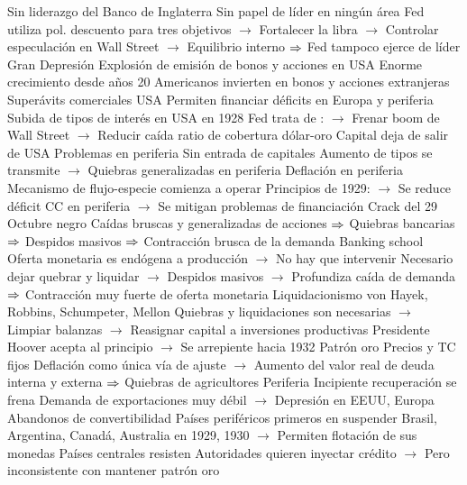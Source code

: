 \documentclass{nuevotema}
\begin{document}
\begin{esquemal}
				\4 Sin liderazgo del Banco de Inglaterra
				\4[] Sin papel de líder en ningún área
				\4[] Fed utiliza pol. descuento para tres objetivos
				\4[] $\to$ Fortalecer la libra
				\4[] $\to$ Controlar especulación en Wall Street
				\4[] $\to$ Equilibrio interno
				\4[] $\Rightarrow$ Fed tampoco ejerce de líder
			\3 Gran Depresión
				\4 Explosión de emisión de bonos y acciones en USA
				\4[] Enorme crecimiento desde años 20
				\4[] Americanos invierten en bonos y acciones extranjeras
				\4 Superávits comerciales USA
				\4[] Permiten financiar déficits en Europa y periferia
				\4 Subida de tipos de interés en USA en 1928
				\4[] Fed trata de :
				\4[] $\to$ Frenar boom de Wall Street
				\4[] $\to$ Reducir caída ratio de cobertura dólar-oro
				\4[] Capital deja de salir de USA
				\4 Problemas en periferia
				\4[] Sin entrada de capitales
				\4[] Aumento de tipos se transmite
				\4[] $\to$ Quiebras generalizadas en periferia
				\4 Deflación en periferia
				\4[] Mecanismo de flujo-especie comienza a operar
				\4[] Principios de 1929:
				\4[] $\to$ Se reduce déficit CC en periferia
				\4[] $\to$ Se mitigan problemas de financiación
				\4 Crack del 29
				\4[] Octubre negro
				\4[] Caídas bruscas y generalizadas de acciones
				\4[] $\Rightarrow$ Quiebras bancarias
				\4[] $\Rightarrow$ Despidos masivos
				\4[] $\Rightarrow$ Contracción brusca de la demanda
				\4 Banking school
				\4[] Oferta monetaria es endógena a producción
				\4[] $\to$ No hay que intervenir
				\4[] Necesario dejar quebrar y liquidar
				\4[] $\to$ Despidos masivos
				\4[] $\to$ Profundiza caída de demanda
				\4[] $\Rightarrow$ Contracción muy fuerte de oferta monetaria
				\4 Liquidacionismo
				\4[] von Hayek, Robbins, Schumpeter, Mellon
				\4[] Quiebras y liquidaciones son necesarias
				\4[] $\to$ Limpiar balanzas
				\4[] $\to$ Reasignar capital a inversiones productivas
				\4[] Presidente Hoover acepta al principio
				\4[] $\to$ Se arrepiente hacia 1932
				\4 Patrón oro
				\4[] Precios y TC fijos
				\4[] Deflación como única vía de ajuste
				\4[] $\to$ Aumento del valor real de deuda interna y externa
				\4[] $\Rightarrow$ Quiebras de agricultores
				\4 Periferia
				\4[] Incipiente recuperación se frena
				\4[] Demanda de exportaciones muy débil
				\4[] $\to$ Depresión en EEUU, Europa
			\3 Abandonos de convertibilidad
				\4 Países periféricos primeros en suspender
				\4[] Brasil, Argentina, Canadá, Australia en 1929, 1930
				\4[] $\to$ Permiten flotación de sus monedas
				\4 Países centrales resisten
				\4[] Autoridades quieren inyectar crédito
				\4[] $\to$ Pero inconsistente con mantener patrón oro

\end{esquemal}
\end{document}
